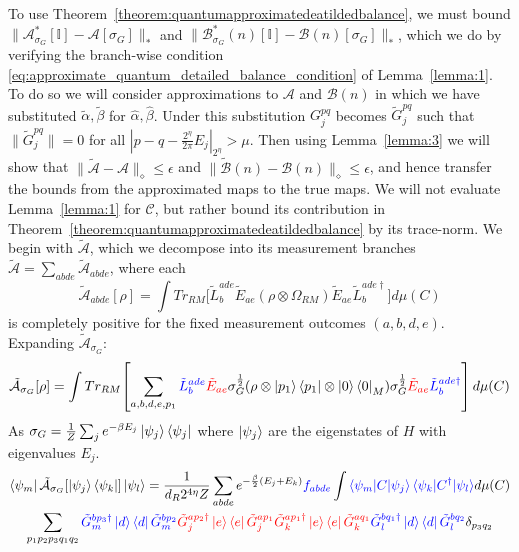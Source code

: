 \documentclass[aps,floatfix,10pt,amssymb,amsfont,amsmath,superscriptaddress,float,nofootinbib,longbibliography,nobalancelastpage,twocolumn]{revtex4-2}
\begin{document}
\begin{widetext}
To use Theorem~\ref{theorem:quantumapproximatedeatildedbalance}, we must bound $\|\mathcal{A}^*_{\sigma_G}[\mathbb{I}]-\mathcal{A}[\sigma_G]\|_*$ and $\|\mathcal{B}^*_{\sigma_G}(n)[\mathbb{I}]-\mathcal{B}(n)[\sigma_G]\|_*$, which we do by verifying the branch-wise condition \eqref{eq:approximate_quantum_detailed_balance_condition} of Lemma~\ref{lemma:1}. To do so we will consider approximations to $\mathcal{A}$ and $\mathcal{B}(n)$ in which we have substituted $\tilde \alpha, \tilde \beta$ for $\hat \alpha, \hat \beta$. Under this substitution $G^{pq}_j$ becomes $\tilde G^{pq}_j$ such that $\|\tilde G^{pq}_j\| =0$ for all $|p-q-\frac{2^{\eta}}{2\pi}E_j|_{2^{\eta}} > \mu$. Then using Lemma~\ref{lemma:3} we will show that $\|\tilde{\mathcal{A}}-\mathcal{A}\|_{\diamond} \leq \epsilon$ and $\|\tilde{\mathcal{B}}(n)-\mathcal{B}(n)\|_{\diamond} \leq \epsilon$, and hence transfer the bounds from the approximated maps to the true maps. We will not evaluate Lemma~\ref{lemma:1} for $\mathcal{C}$, but rather bound its contribution in Theorem~\ref{theorem:quantumapproximatedeatildedbalance} by its trace-norm. We begin with $\tilde{\mathcal{A}}$, which we decompose into its measurement branches $\tilde{\mathcal{A}} = \sum_{abde}\tilde{\mathcal{A}}_{abde}$, where each
\begin{equation}
    \tilde{\mathcal{A}}_{abde}[\rho] = \int  Tr_{RM}\bigg[\tilde L_b^{ade} \tilde E_{ae} ( \rho\otimes \Omega_{RM})
     \tilde E_{ae}\tilde L^{ade\dagger}_b\bigg]d\mu(C)
\end{equation}
is completely positive for the fixed measurement outcomes $(a,b,d,e)$. Expanding $\tilde{\mathcal{A}}_{\sigma_G}$:
    \begin{equation}
    \tilde{\mathcal{A}}_{\sigma_G}[\rho] = \int Tr_{RM}\!\left[\sum_{a,b,d,e,p_1}\textcolor{blue}{\tilde L^{ade}_b} \textcolor{red}{\tilde E_{ae}} \sigma_G^{\frac{1}{2}} (\rho\otimes \ket{p_1}\bra{p_1}\otimes \ket{0}\bra{0}_M) \sigma_G^{\frac{1}{2}}\textcolor{red}{\tilde E_{ae}}\textcolor{blue}{\tilde L^{ade\dagger}_b}\right] d\mu(C)
\end{equation}
As $\sigma_G = \frac{1}{Z}\sum_j e^{-\beta E_j} \ket{\psi_j}\bra{\psi_j}$ where $\ket{\psi_j}$ are the eigenstates of $H$ with eigenvalues $E_j$. 
\begin{multline}
    \bra{\psi_m}\tilde{\mathcal{A}}_{\sigma_G}[\ket{\psi_j}\bra{\psi_k}]\ket{\psi_l}=\frac{1}{d_R2^{4\eta}Z} \sum_{abde} e^{-\frac{\beta}{2}(E_j+E_k)}\textcolor{blue}{f_{abde}} \int \textcolor{blue}{\braket{\psi_m|C|\psi_j}\braket{\psi_k|C^{\dagger}|\psi_l}} d\mu(C)\\\sum_{p_1p_2p_3q_1 q_2} \textcolor{blue}{\tilde G^{bp_3\dagger}_m\ket{d}\bra{d}\tilde G^{bp_2}_m} \textcolor{red}{\tilde G_j^{ap_2\dagger}\ket{e}\bra{e}\tilde G_j^{ap_1}\tilde G_k^{ap_1\dagger}\ket{e}\bra{e}\tilde G_k^{aq_1}} \textcolor{blue}{\tilde G^{bq_1\dagger}_l\ket{d}\bra{d}\tilde G^{bq_2}_l} \delta_{p_3q_2}

\end{multline}
\end{widetext}
\end{document}
